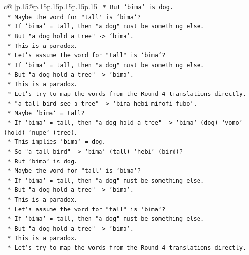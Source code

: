 \documentclass{article}
\begin{document}
{\begin{supertabular}{c@{$\;$}|p{.15\linewidth}@{}p{.15\linewidth}p{.15\linewidth}p{.15\linewidth}p{.15\linewidth}p{.15\linewidth}}
{{{\texttt{        *   But `bima` is dog.} \\
\texttt{        *   Maybe the word for "tall" is `bima`?} \\
\texttt{        *   If `bima` = tall, then "a dog" must be something else.} \\
\texttt{        *   But "a dog hold a tree" {-}> `bima`.} \\
\texttt{        *   This is a paradox.} \\
\texttt{        *   Let's assume the word for "tall" is `bima`?} \\
\texttt{        *   If `bima` = tall, then "a dog" must be something else.} \\
\texttt{        *   But "a dog hold a tree" {-}> `bima`.} \\
\texttt{        *   This is a paradox.} \\
\texttt{        *   Let's try to map the words from the Round 4 translations directly.} \\
\texttt{        *   "a tall bird see a tree" {-}> `bima hebi mifofi fubo`.} \\
\texttt{        *   Maybe `bima` = tall?} \\
\texttt{        *   If `bima` = tall, then "a dog hold a tree" {-}> `bima` (dog) `vomo` (hold) `nupe` (tree).} \\
\texttt{        *   This implies `bima` = dog.} \\
\texttt{        *   So "a tall bird" {-}> `bima` (tall) `hebi` (bird)?} \\
\texttt{        *   But `bima` is dog.} \\
\texttt{        *   Maybe the word for "tall" is `bima`?} \\
\texttt{        *   If `bima` = tall, then "a dog" must be something else.} \\
\texttt{        *   But "a dog hold a tree" {-}> `bima`.} \\
\texttt{        *   This is a paradox.} \\
\texttt{        *   Let's assume the word for "tall" is `bima`?} \\
\texttt{        *   If `bima` = tall, then "a dog" must be something else.} \\
\texttt{        *   But "a dog hold a tree" {-}> `bima`.} \\
\texttt{        *   This is a paradox.} \\
\texttt{        *   Let's try to map the words from the Round 4 translations directly.} \\
}}}
\end{supertabular}}
\end{document}
